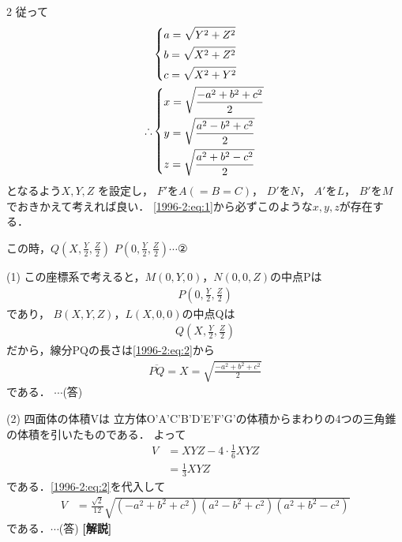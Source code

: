 \documentclass[../../../../main.tex]{subfiles}
\begin{document}
\begin{multicols}{2}
  従って
  \begin{align}
     & \begin{dcases}
         a = \sqrt{Y^2+Z^2} \\
         b = \sqrt{X^2+Z^2} \\
         c = \sqrt{X^2+Y^2}
       \end{dcases}                 \\
    \therefore
     & \begin{dcases}
         x = \sqrt{\frac{-a^2+b^2+c^2}{2}} \\
         y = \sqrt{\frac{a^2-b^2+c^2}{2}}  \\
         z = \sqrt{\frac{a^2+b^2-c^2}{2}}
       \end{dcases} \label{1996-2:eq:2}
  \end{align}
  となるよう$X,Y,Z$ を設定し，
  $F'$を$A(=B=C)$，
  $D'$を$N$，
  $A'$を$L$，
  $B'$を$M$
  でおきかえて考えれば良い．
  \cref{1996-2:eq:1}から必ずこのような$x,y,z$が存在する．

  この時，$Q (X, \frac{Y}{2}, \frac{Z}{2})$
  $P (0, \frac{Y}{2}, \frac{Z}{2}) \cdots ②$

  (1)
  この座標系で考えると，$M(0,Y,0)$，$N(0,0,Z)$の中点Pは
  \begin{align*}
    P\left(0,\frac{Y}{2},\frac{Z}{2}\right)
  \end{align*}
  であり，
  $B(X,Y,Z)$，$L(X,0,0)$の中点Qは
  \begin{align*}
    Q\left(X,\frac{Y}{2},\frac{Z}{2}\right)
  \end{align*}
  だから，線分PQの長さは\cref{1996-2:eq:2}から
  \begin{align*}
    \overline{PQ} = X = \sqrt{\frac{-a^2+b^2+c^2}{2}}
  \end{align*}
  である．  $\cdots$(答)
  \vspace{10pt}

  (2)
  四面体の体積Vは 立方体O'A'C'B'D'E'F'G'の体積からまわりの4つの三角錐の体積を引いたものである．
  よって
  \begin{align*}
    V
     & = XYZ - 4 \cdot \frac{1}{6}XYZ \\
     & = \frac{1}{3}XYZ
  \end{align*}
  である．\cref{1996-2:eq:2}を代入して
  \begin{align*}
    V
     & = \frac{\sqrt{2}}{12} \sqrt{(-a^2+b^2+c^2)(a^2-b^2+c^2)(a^2+b^2-c^2)}
  \end{align*}
  である．$\cdots$(答)
  \vspace{10pt}
  {\bf[解説]}

  \newpage
\end{multicols}
\end{document}
